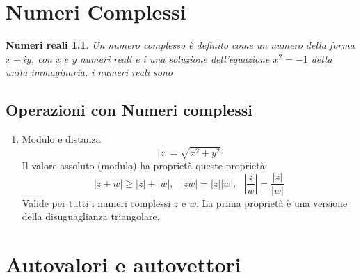 \documentclass{book}
\newcommand{\abs}[1]{\lvert#1\rvert}
\begin{document}
\chapter {Numeri Complessi}
\newtheorem{NumComp}{Numeri reali}
\begin{NumComp}
	Un numero complesso è definito come un numero della forma $x+iy$, con x e y numeri reali e i una
	soluzione dell'equazione $x^2=-1$ detta unità immaginaria. i numeri reali
	sono
\end{NumComp}
\section{Operazioni con Numeri complessi}
\begin{enumerate}
\item Modulo e distanza
	\begin{equation}
		\abs{z}=\sqrt{x^2+y^2}
	\end{equation}
	Il valore assoluto (modulo) ha proprietà queste proprietà:
	\begin{equation*}
		\abs{z+w}\geq \abs{z}+\abs{w}, \text{ } \abs{zw}=\abs{z}\abs{w}, \text{ } \left|\frac{z}{w}\right|=\frac{\abs z}{\abs w}
	\end{equation*}
	Valide per tutti i numeri complessi $z$ e $w$. La prima proprietà è una versione della disuguaglianza triangolare.

\end{enumerate}
\chapter {Autovalori e autovettori}
\end{document}
